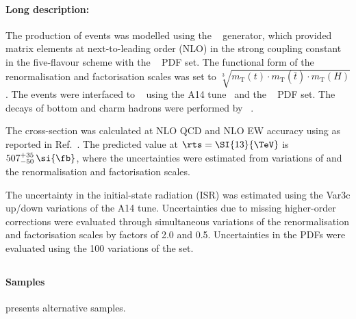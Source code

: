 \paragraph{Long description:}

The production of \ttH events was modelled using the
\POWHEGBOX[v2]~\cite{Frixione:2007nw,Nason:2004rx,Frixione:2007vw,Alioli:2010xd,Hartanto:2015uka}
generator, which provided matrix elements at next-to-leading order (NLO) in the strong coupling 
constant \alphas in the five-flavour scheme with the \NNPDF[3.0nlo]~\cite{Ball:2014uwa} PDF set.
The functional form of the renormalisation and factorisation scales was
set to $\sqrt[3]{m_\text{T}(t)\cdot m_\text{T}(\bar{t}) \cdot m_\text{T}(H)}$.
The events were interfaced to \PYTHIA[8.230]~\cite{Sjostrand:2014zea}
using the A14 tune~\cite{ATL-PHYS-PUB-2014-021} and the
\NNPDF[2.3lo]~\cite{Ball:2014uwa} PDF set. The decays of bottom and charm hadrons
were performed by \EVTGEN[1.6.0]~\cite{Lange:2001uf}.

The cross-section was calculated at NLO QCD and NLO EW accuracy using
\MGNLO as reported in Ref.~\cite{deFlorian:2016spz}.
The predicted value at $\rts = \SI{13}{\TeV}$ is
$507^{+35}_{-50}\,\si{\fb}$, where the uncertainties were estimated from
variations of \alphas and the renormalisation and factorisation scales.

The uncertainty in the initial-state radiation (ISR) was estimated using the Var3c
up/down variations of the A14 tune. Uncertainties due to missing
higher-order corrections were evaluated through simultaneous variations of the
renormalisation and factorisation scales by factors of
2.0 and 0.5. Uncertainties in the PDFs were evaluated using the 100
variations of the \NNPDF[3.0nlo] set.


\subsection[Powheg+Herwig7]{\POWHER[7]}

\paragraph{Samples}

 presents alternative \ttH samples.

